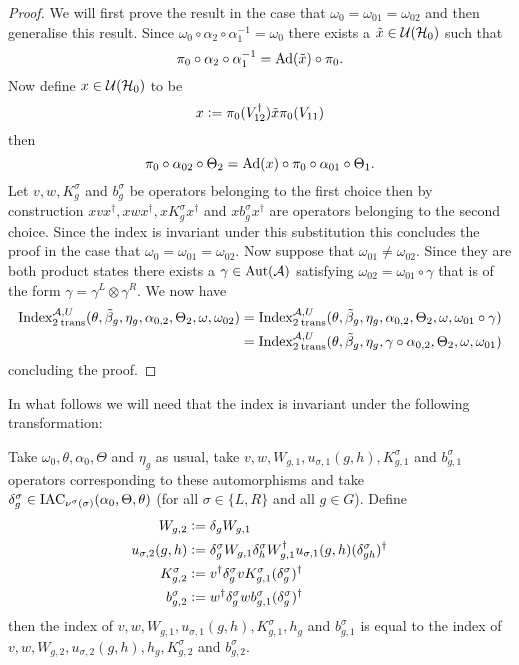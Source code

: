 \documentclass[11pt,a4paper,twoside]{article}
\numberwithin{equation}{section}
\begin{document}
\begin{proof}
	We will first prove the result in the case that $\omega_0=\omega_{01}=\omega_{02}$ and then generalise this result. Since $\omega_0\circ\alpha_2\circ\alpha_1^{-1}=\omega_0$ there exists a $\tilde{x}\in\UU(\HH_0)$ such that
	\begin{equation}
		\pi_0\circ\alpha_2\circ\alpha_1^{-1}=\Ad{\tilde{x}}\circ\pi_0.
	\end{equation}
	Now define $x\in\UU(\HH_0)$ to be
	\begin{equation}
		x\defeq \pi_0(V_{12}^\dagger)\tilde{x} \pi_0(V_{11})
	\end{equation}
	then
	\begin{equation}
		\pi_0\circ\alpha_{02}\circ\Theta_2=\Ad{x}\circ\pi_0\circ\alpha_{01}\circ\Theta_1.
	\end{equation}
	Let $v,w,K_g^\sigma$ and $b_g^\sigma$ be operators belonging to the first choice then by construction $xvx^\dagger,xwx^\dagger,xK_g^\sigma x^\dagger$ and $xb_g^\sigma x^\dagger$ are operators belonging to the second choice. Since the index is invariant under this substitution this concludes the proof in the case that $\omega_0=\omega_{01}=\omega_{02}$. Now suppose that $\omega_{01}\neq\omega_{02}$. Since they are both product states there exists a $\gamma\in\Aut{\AA}$ satisfying $\omega_{02}=\omega_{01}\circ\gamma$ that is of the form $\gamma=\gamma^L\otimes\gamma^R$. We now have
	\begin{align}
		\textrm{Index}_{2\:\text{trans}}^{\AA,U}(\theta,\tilde{\beta}_g,\eta_g,\alpha_{0,2},\Theta_2,\omega,\omega_{02})&=\textrm{Index}_{2\:\text{trans}}^{\AA,U}(\theta,\tilde{\beta}_g,\eta_g,\alpha_{0,2},\Theta_2,\omega,\omega_{01}\circ\gamma)\\
		&=\textrm{Index}_{2\:\text{trans}}^{\AA,U}(\theta,\tilde{\beta}_g,\eta_g,\gamma\circ\alpha_{0,2},\Theta_2,\omega,\omega_{01})
	\end{align}
	concluding the proof.
\end{proof}
In what follows we will need that the index is invariant under the following transformation:
\begin{lemma}\label{lem:TransformationUnderDeltaTwoTranslations}
	Take $\omega_0,\theta,\alpha_0,\Theta$ and $\eta_g$ as usual, take $v,w,W_{g,1},u_{\sigma,1}(g,h),K_{g,1}^\sigma$ and $b_{g,1}^\sigma$ operators corresponding to these automorphisms and take $\delta^\sigma_g\in\IAC_{\nu^\sigma(\sigma)}(\alpha_0,\Theta,\theta)$ (for all $\sigma\in\{L,R\}$ and all $g\in G$). Define
	\begin{align}
		W_{g,2}&\defeq\delta_g W_{g,1}\\
		u_{\sigma,2}(g,h)&\defeq \delta_g^\sigma W_{g,1}\delta_h^\sigma W_{g,1}^\dagger u_{\sigma,1}(g,h)(\delta_{gh}^\sigma)^\dagger\\
		K^\sigma_{g,2}&\defeq v^\dagger \delta_g^\sigma v K_{g,1}^\sigma (\delta_g^\sigma)^\dagger\\
		b_{g,2}^\sigma&\defeq w^\dagger\delta^\sigma_g w b_{g,1}^\sigma (\delta^\sigma_g)^\dagger
	\end{align}
	then the index of $v,w,W_{g,1},u_{\sigma,1}(g,h),K_{g,1}^\sigma,h_g$ and $b_{g,1}^\sigma$ is equal to the index of $v,w,W_{g,2},u_{\sigma,2}(g,h),h_g,K_{g,2}^\sigma$ and $b_{g,2}^\sigma$.
\end{lemma}
\end{document}
